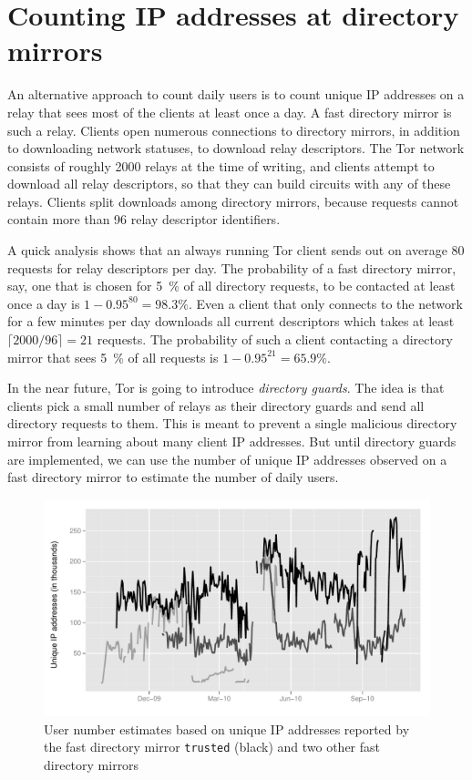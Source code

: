 \documentclass{article}
\begin{document}
\section{Counting IP addresses at directory mirrors}
\label{sec:entry}

An alternative approach to count daily users is to count unique IP
addresses on a relay that sees most of the clients at least once a day.
A fast directory mirror is such a relay.
Clients open numerous connections to directory mirrors, in addition to
downloading network statuses, to download relay descriptors.
The Tor network consists of roughly 2000 relays at the time of writing,
and clients attempt to download all relay descriptors, so that they can
build circuits with any of these relays.
Clients split downloads among directory mirrors, because requests cannot
contain more than 96 relay descriptor identifiers.

A quick analysis shows that an always running Tor client sends out on
average 80 requests for relay descriptors per day.
The probability of a fast directory mirror, say, one that is chosen for
5~\% of all directory requests, to be contacted at least once a day is
$1-0.95^{80} = 98.3\%$.
Even a client that only connects to the network for a few minutes per day
downloads all current descriptors which takes at least
$\lceil2000 / 96\rceil = 21$ requests.
The probability of such a client contacting a directory mirror that sees
5~\% of all requests is $1-0.95^{21} = 65.9\%$.

In the near future, Tor is going to introduce \emph{directory guards}.
The idea is that clients pick a small number of relays as their directory
guards and send all directory requests to them.
This is meant to prevent a single malicious directory mirror from learning
about many client IP addresses.
But until directory guards are implemented, we can use the number of
unique IP addresses observed on a fast directory mirror to estimate the
number of daily users.

\begin{figure}[t]
\includegraphics[width=\textwidth]{entrystats.pdf}
\caption{User number estimates based on unique IP addresses reported by
the fast directory mirror \texttt{trusted} (black) and two other fast
directory mirrors}
\label{fig:entrystats}
\end{figure}
\end{document}

